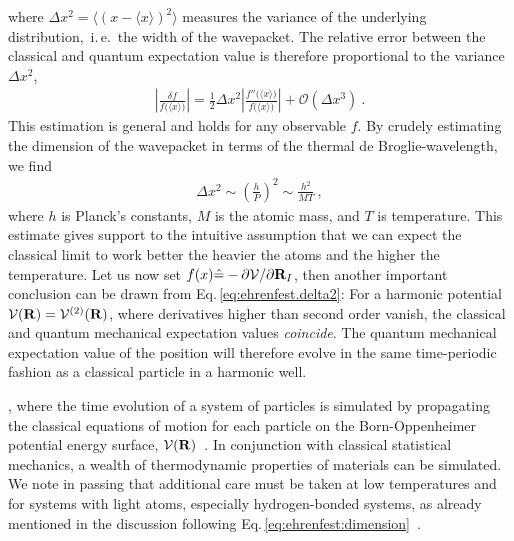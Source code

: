 where $\Delta x^2 = \bm{\langle} (x - \langle x \rangle)^2 \bm{\rangle}$ measures the variance of the underlying distribution,~i.\,e.~the width of the wavepacket. The relative error between the classical and quantum expectation value is %
therefore proportional to the variance $\Delta x^2$,
\begin{align}
\left\lvert \frac{\delta f}{f \bm ( \langle x \rangle \bm{)}} \right\rvert
= \frac{1}{2} \Delta x^2 \left\lvert \frac{f'' \bm ( \langle x \rangle \bm{)}}{f \bm ( \langle x \rangle \bm{)}} \right\rvert
+ \mathcal{O}(\Delta x^3)~.
\label{eq:ehrenfest.delta2}
\end{align}
This estimation is general and holds for any observable $f$.
By crudely estimating the dimension of the wavepacket in terms of the thermal de Broglie-wavelength, we find
\begin{align}
\Delta x^2 
\sim \left( \frac{h}{P} \right)^2
\sim \frac{h^2}{MT}~,
\label{eq:ehrenfest:dimension}
\end{align}
where $h$ is Planck's constants, $M$ is the atomic mass, and $T$ is temperature. This estimate gives support to the intuitive assumption that we can expect the classical limit to work better the heavier the atoms and the higher the temperature.
Let us now set $f(x) \hat = -\partial \mathcal V / \partial {\bf R}_I$, then another important conclusion can be drawn from Eq.\,\eqref{eq:ehrenfest.delta2}: For a harmonic potential $\mathcal V ({\bf R}) = \mathcal V^{(2)} ({\bf R})$, where derivatives higher than second order vanish, the classical and quantum mechanical expectation values \emph{coincide}. The quantum mechanical expectation value of the position will therefore evolve in the same time-periodic fashion as a classical particle in a harmonic well.

, where the time evolution of a system of particles is simulated by propagating the classical equations of motion for each particle on the Born-Oppenheimer potential energy surface, $\mathcal V ({\bf R})$~. In conjunction with classical statistical mechanics, a wealth of thermodynamic properties of materials can be simulated.
We note in passing that
additional care must be taken at low temperatures and for systems with light atoms, especially hydrogen-bonded systems, as already mentioned in the discussion following Eq.\,\eqref{eq:ehrenfest:dimension}~.

